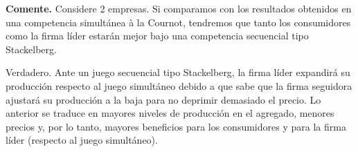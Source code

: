 \question \textbf{Comente.} Considere 2 empresas. Si comparamos con los resultados obtenidos en una competencia simultánea à la Cournot, tendremos que tanto los consumidores como la firma líder estarán mejor bajo una competencia secuencial tipo Stackelberg.
\begin{solution}
Verdadero. Ante un juego secuencial tipo Stackelberg, la firma líder expandirá su producción respecto al juego simultáneo debido a que sabe que la firma seguidora ajustará su producción a la baja para no deprimir demasiado el precio. Lo anterior se traduce en mayores niveles de producción en el agregado, menores precios y, por lo tanto, mayores beneficios para los consumidores y para la firma líder (respecto al juego simultáneo).

\end{solution}

